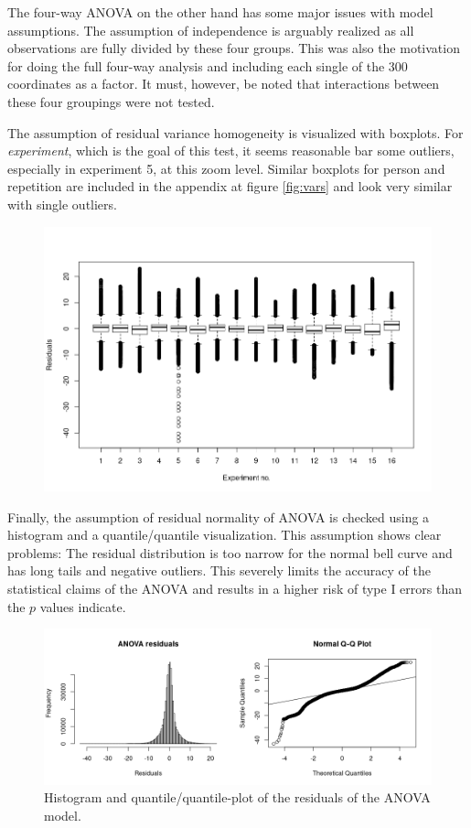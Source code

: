 \documentclass[11pt,fleqn]{article}
\begin{document}
The four-way ANOVA on the other hand has some major issues with model assumptions. The assumption of independence is arguably realized as all observations are fully divided by these four groups. This was also the motivation for doing the full four-way analysis and including each single of the 300 coordinates as a factor. It must, however, be noted that interactions between these four groupings were not tested.

The assumption of residual variance homogeneity is visualized with boxplots. For \textit{experiment}, which is the goal of this test, it seems reasonable bar some outliers, especially in experiment 5, at this zoom level. Similar boxplots for person and repetition are included in the appendix  at figure \ref{fig:vars} and look very similar with single outliers.
\begin{figure}[H]
	\centering
	\includegraphics[width=.7\textwidth]{var_exp}
\label{fig:vexp}
\end{figure}\noindent
Finally, the assumption of residual normality of ANOVA is checked using a histogram and a quantile/quantile visualization. This assumption shows clear problems: The residual distribution is too narrow for the normal bell curve and has long tails and negative outliers. This severely limits the accuracy of the statistical claims of the ANOVA and results in a higher risk of type I errors than the \(p\) values indicate.
\begin{figure}[H]
	\centering
	\includegraphics[width=.7\textwidth]{qq}
	\caption{Histogram and quantile/quantile-plot of the residuals of the ANOVA model.}\label{fig:qq}
\end{figure}
\end{document}
